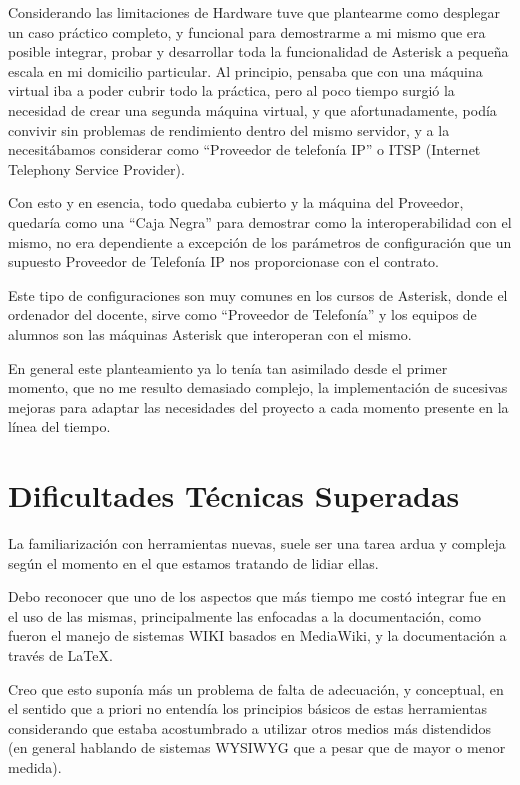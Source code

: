 Considerando las limitaciones de Hardware tuve que plantearme como desplegar un caso práctico completo, y funcional para demostrarme a mi mismo que era posible integrar, probar y desarrollar toda la funcionalidad de Asterisk a pequeña escala en mi domicilio particular. Al principio, pensaba que con una máquina virtual iba a poder cubrir todo la práctica, pero al poco tiempo surgió la necesidad de crear una segunda máquina virtual, y que afortunadamente, podía convivir sin problemas de rendimiento dentro del mismo servidor, y a la necesitábamos considerar como ``Proveedor de telefonía IP'' o ITSP (Internet Telephony Service Provider). 

Con esto y en esencia, todo quedaba cubierto y la máquina del Proveedor, quedaría como una ``Caja Negra'' para demostrar como la interoperabilidad con el mismo, no era dependiente a excepción de los parámetros de configuración que un supuesto Proveedor de Telefonía IP nos proporcionase con el contrato.

Este tipo de configuraciones son muy comunes en los cursos de Asterisk, donde el ordenador del docente, sirve como ``Proveedor de Telefonía'' y los equipos de alumnos son las máquinas Asterisk que interoperan con el mismo.

En general este planteamiento ya lo tenía tan asimilado desde el primer momento, que no me resulto demasiado complejo, la implementación de sucesivas mejoras para adaptar las necesidades del proyecto a cada momento presente en la línea del tiempo.

\section{Dificultades Técnicas Superadas}

La familiarización con herramientas nuevas, suele ser una tarea ardua y compleja según el momento en el que estamos tratando de lidiar ellas.

Debo reconocer que uno de los aspectos que más tiempo me costó integrar fue en el uso de las mismas, principalmente las enfocadas a la documentación, como fueron el manejo de sistemas WIKI basados en MediaWiki, y la documentación a través de \LaTeX. 

Creo que esto suponía más un problema de falta de adecuación, y conceptual, en el sentido que a priori no entendía los principios básicos de estas herramientas considerando que estaba acostumbrado a utilizar otros medios más distendidos (en general hablando de sistemas WYSIWYG que a pesar que de mayor o menor medida).

